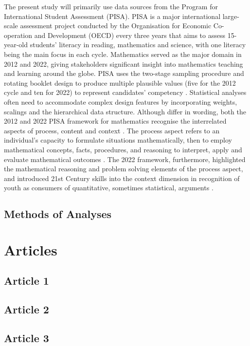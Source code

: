 \documentclass[
    a4paper,                %
    11pt,                   %
    stu,                    %
    donotrepeattitle,       %
    floatsintext,           %
    biblatex,               %
    colorlinks=true,        %
    linkcolor=red,          %
    anchorcolor=black,      %
    citecolor=blue,         %
    urlcolor=blue,          %
    bookmarks=true,         %
    bookmarksopen=false,    %
    bookmarksnumbered=true, %
    dvipsnames              %
]{apa7}
\begin{document}
The present study will primarily use data sources from the Program for International Student Assessment (PISA). PISA is a major international large-scale assessment project conducted by the Organisation for Economic Co-operation and Development (OECD) every three years that aims to assess 15-year-old students' literacy in reading, mathematics and science, with one literacy being the main focus in each cycle. Mathematics served as the major domain in 2012 and 2022, giving stakeholders significant insight into mathematics teaching and learning around the globe. PISA uses the two-stage sampling procedure and rotating booklet design to produce multiple plausible values (five for the 2012 cycle and ten for 2022) to represent candidates' competency \parencite{rust:2014}. Statistical analyses often need to accommodate complex design features by incorporating weights, scalings and the hierarchical data structure. Although differ in wording, both the 2012 and 2022 PISA framework for mathematics recognise the interrelated aspects of process, content and context \parencite{oecd:2013}. The process aspect refers to an individual's capacity to formulate situations mathematically, then to employ mathematical concepts, facts, procedures, and reasoning to interpret, apply and evaluate mathematical outcomes \parencite[][p. 28]{oecd:2013}. The 2022 framework, furthermore, highlighted the mathematical reasoning and problem solving elements of the process aspect, and introduced 21st Century skills into the context dimension in recognition of youth as consumers of quantitative, sometimes statistical, arguments \parencite{oecd:2018}.

\subsection{Methods of Analyses}

\section{Articles}

\subsection{Article 1}

\subsection{Article 2}

\subsection{Article 3}
\end{document}
